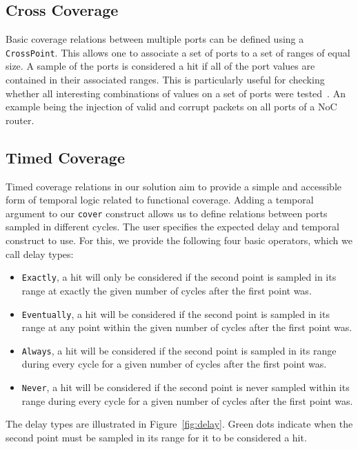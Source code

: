\documentclass[conference]{IEEEtran}
\begin{document}
\subsection{Cross Coverage}
Basic coverage relations between multiple ports can be defined using a \texttt{CrossPoint}. 
This allows one to associate a set of ports to a set of ranges of equal size.  
A sample of the ports is considered a hit if all of the port values are contained in their associated ranges. This is particularly useful for checking whether all interesting combinations of values on a set of ports were tested~\cite{hdlverify}. An example being the injection of valid and corrupt packets on all ports of a NoC router. %

\subsection{Timed Coverage}
Timed coverage relations in our solution aim to provide a simple and accessible form of temporal logic related to functional coverage. Adding a temporal argument to our \texttt{cover} construct allows us to define relations between ports sampled in different cycles. The user specifies the expected delay and temporal construct to use. For this, we provide the following four basic operators, which we call delay types:%
\begin{itemize}
 \item \texttt{Exactly}, a hit will only be considered if the second point is sampled in its range at exactly the given number of cycles after the first point was.
 \item \texttt{Eventually}, a hit will be considered if the second point is sampled in its range at any point within the given number of cycles after the first point was.  
 \item \texttt{Always}, a hit will be considered if the second point is sampled in its range during every cycle for a given number of cycles after the first point was.
 \item \texttt{Never}, a hit will be considered if the second point is never sampled within its range during every cycle for a given number of cycles after the first point was.
\end{itemize}  
The delay types are illustrated in Figure~\ref{fig:delay}. Green dots indicate when the second point must be sampled in its range for it to be considered a hit. %
\end{document}
